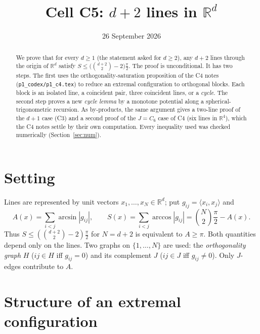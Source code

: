 \documentclass[11pt]{article}
\theoremstyle{remark}
\begin{document}
\title{Cell C5: $d+2$ lines in $\mathbb R^d$}
\date{26 September 2026}
\maketitle

\noindent{}
\medskip

\begin{abstract}
We prove that for every $d\ge 1$ (the statement asked for $d\ge2$), any $d+2$ lines through the origin of
$\mathbb R^d$ satisfy $S\le\bigl(\binom{d+2}{2}-2\bigr)\frac{\pi}{2}$.
The proof is unconditional. It has two steps. The first uses the orthogonality-saturation
proposition of the C4 notes (\texttt{p1\_codex/p1\_c4.tex}) to
reduce an extremal configuration to orthogonal blocks. Each block is an isolated line, a coincident pair,
three coincident lines, or a \emph{cycle}. The second step proves a
new \emph{cycle lemma} by a monotone potential along a spherical-trigonometric
recursion. As by-products, the same argument gives a two-line proof of
the $d+1$ case (C3) and a second proof of the $J=C_6$ case of C4
(six lines in $\mathbb R^4$), which the C4 notes settle by their own computation. Every inequality used was checked
numerically (Section~\ref{sec:num}).
\end{abstract}

\section{Setting}
Lines are represented by unit vectors $x_1,\dots,x_N\in\mathbb R^d$;
put $g_{ij}=\langle x_i,x_j\rangle$ and
\[
A(x)=\sum_{i<j}\arcsin|g_{ij}|,\qquad
S(x)=\sum_{i<j}\arccos|g_{ij}|=\binom N2\frac\pi2-A(x).
\]
Thus $S\le(\binom{d+2}2-2)\frac\pi2$ for $N=d+2$ is equivalent to
$A\ge\pi$. Both quantities depend only on the lines. Two graphs on
$\{1,\dots,N\}$ are used: the \emph{orthogonality graph} $H$ ($ij\in H$
iff $g_{ij}=0$) and its complement $J$ ($ij\in J$ iff $g_{ij}\neq0$).
Only $J$-edges contribute to $A$.

\section{Structure of an extremal configuration}
\end{document}
